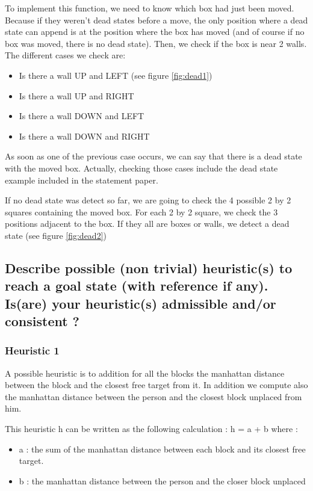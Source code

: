 \documentclass{article}
\begin{document}
To implement this function, we need to know which box had just been moved. Because if they weren't dead states before a move, the only position where a dead state can append is at the position where the box has moved (and of course if no box was moved, there is no dead state).
Then, we check if the box is near 2 walls. The different cases we check are:
\begin{itemize}
\item Is there a wall UP and LEFT (see figure \ref{fig:dead1})
\item Is there a wall UP and RIGHT
\item Is there a wall DOWN and LEFT
\item Is there a wall DOWN and RIGHT
\end{itemize}
As soon as one of the previous case occurs, we can say that there is a dead state with the moved box.
Actually, checking those cases include the dead state example included in the statement paper.

If no dead state was detect so far, we are going to check the 4 possible 2 by 2 squares containing the moved box.
For each 2 by 2 square, we check the 3 positions adjacent to the box. If they all are boxes or walls, we detect a dead state (see figure \ref{fig:dead2})

\subsection*{Describe possible (non trivial) heuristic(s) to reach a goal state (with reference if any). Is(are) your heuristic(s) admissible and/or consistent ?}

\subsubsection*{Heuristic 1}
A possible heuristic is to addition for all the blocks the manhattan distance between the block and the closest free target from it. In addition we compute also the manhattan distance between the person and the closest block unplaced from him.


This heuristic h can be written as the following calculation :
h = a + b where :
\begin{itemize}
\item a : the sum of the manhattan distance between each block and its closest free target.
\item b : the manhattan distance between the person and the closer block unplaced
\end{itemize}
\end{document}
